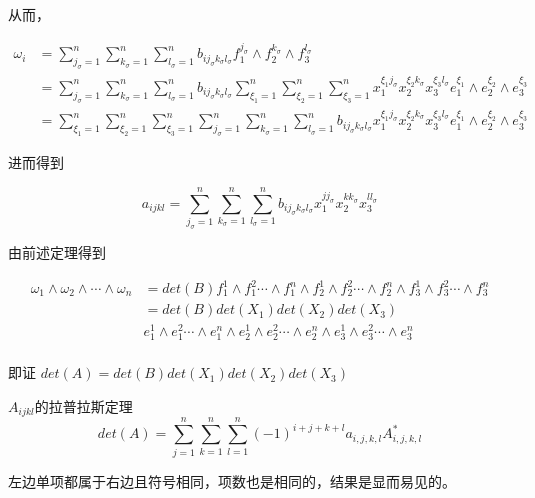 \documentclass{amsc}          %
\numberwithin{equation}{section} %
\begin{document}
\begin{prof}
从而，

\begin{equation}
\begin{aligned}
\omega_{i}
&= \sum_{j_{\sigma}=1}^{n}\sum_{k_{\sigma}=1}^{n}\sum_{l_{\sigma}=1}^{n} b_{ij_{\sigma}k_{\sigma}l_{\sigma}} f_{1}^{j_{\sigma}} \wedge f_{2}^{k_{\sigma}} \wedge f_{3}^{l_{\sigma}} \\
&= \sum_{j_{\sigma}=1}^{n}\sum_{k_{\sigma}=1}^{n}\sum_{l_{\sigma}=1}^{n} b_{ij_{\sigma}k_{\sigma}l_{\sigma}}
\sum_{\xi_{1}=1}^{n}\sum_{\xi_{2}=1}^{n}\sum_{\xi_{3}=1}^{n}x_{1}^{\xi_{1}j_{\sigma}}x_{2}^{\xi_{2}k_{\sigma}}x_{3}^{\xi_{3}l_{\sigma}}e_{1}^{\xi_{1}}\wedge e_{2}^{\xi_{2}}\wedge e_{3}^{\xi_{3}}\\
&= \sum_{\xi_{1}=1}^{n}\sum_{\xi_{2}=1}^{n}\sum_{\xi_{3}=1}^{n}\sum_{j_{\sigma}=1}^{n}\sum_{k_{\sigma}=1}^{n}\sum_{l_{\sigma}=1}^{n}b_{ij_{\sigma}k_{\sigma}l_{\sigma}}
x_{1}^{\xi_{1}j_{\sigma}}x_{2}^{\xi_{2}k_{\sigma}}x_{3}^{\xi_{3}l_{\sigma}}e_{1}^{\xi_{1}}\wedge e_{2}^{\xi_{2}}\wedge e_{3}^{\xi_{3}}
\end{aligned}\end{equation}

进而得到

$$a_{ijkl}=\sum_{j_{\sigma}=1}^{n}\sum_{k_{\sigma}=1}^{n}\sum_{l_{\sigma}=1}^{n}b_{ij_{\sigma}k_{\sigma}l_{\sigma}}x_{1}^{jj_{\sigma}}x_{2}^{kk_{\sigma}}x_{3}^{ll_{\sigma}}$$

由前述定理得到

\begin{equation}
\begin{aligned}
\omega_{1}\wedge\omega_{2}\wedge\cdots\wedge\omega_{n}
& = det(B) f_{1}^1\wedge f_{1}^2 \cdots \wedge f_{1}^n \wedge f_{2}^1\wedge f_{2}^2 \cdots \wedge f_{2}^n
\wedge f_{3}^1\wedge f_{3}^2 \cdots \wedge f_{3}^n\\
& = det(B)det(X_{1})det(X_{2})det(X_{3}) \\
&e_{1}^1\wedge e_{1}^2 \cdots \wedge e_{1}^n \wedge e_{2}^1\wedge e_{2}^2 \cdots \wedge e_{2}^n
\wedge e_{3}^1\wedge e_{3}^2 \cdots \wedge e_{3}^n\\
\end{aligned}
\end{equation}

即证 $det(A) = det(B)det(X_{1})det(X_{2})det(X_{3})$
\end{prof}

\begin{theorem}  $A_{ijkl}$的拉普拉斯定理
$$det(A)=\sum\limits_{j=1}^n \sum\limits_{k=1}^n \sum\limits_{l=1}^n (-1)^{i+j+k+l} a_{i,j,k,l} A^{*}_{i,j,k,l} $$
\end{theorem}
\begin{prof}
左边单项都属于右边且符号相同，项数也是相同的，结果是显而易见的。
\end{prof}
\end{document}
